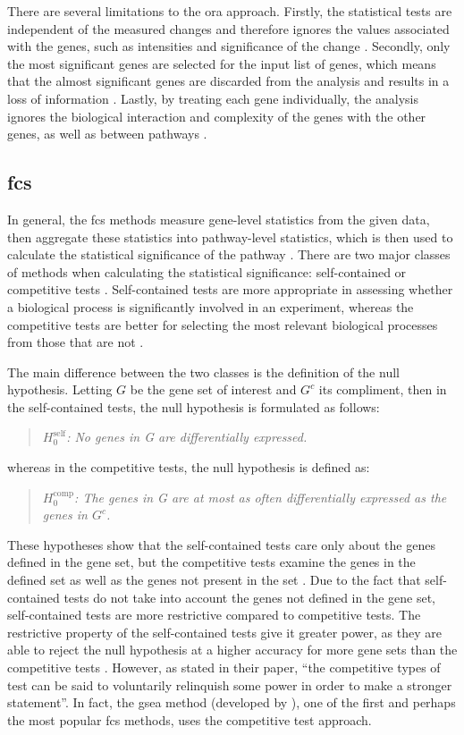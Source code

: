 There are several limitations to the \gls{ora} approach.
Firstly, the statistical tests are independent of the measured changes and therefore ignores the values associated with the genes, such as intensities and significance of the change \citep{Khatri2012}.
Secondly, only the most significant genes are selected for the input list of genes, which means that the almost significant genes are discarded from the analysis and results in a loss of information \citep{Khatri2012}.
Lastly, by treating each gene individually, the analysis ignores the biological interaction and complexity of the genes with the other genes, as well as between pathways \citep{Khatri2012}.

\subsection{\Gls{fcs}}
\label{ssub:fcs}

In general, the \gls{fcs} methods measure gene-level statistics from the given data, then aggregate these statistics into pathway-level statistics, which is then used to calculate the statistical significance of the pathway \citep{Khatri2012}.
There are two major classes of methods when calculating the statistical significance: self-contained or competitive tests \citep{Goeman2007}.
Self-contained tests are more appropriate in assessing whether a biological process is significantly involved in an experiment, whereas the competitive tests are better for selecting the most relevant biological processes from those that are not \citep{Wu2012}.

The main difference between the two classes is the definition of the null hypothesis.
Letting $G$ be the gene set of interest and $G^c$ its compliment, then in the self-contained tests, the null hypothesis is formulated as follows:
\begin{quote}
	\textit{$H_0^{\textrm{self}}$: No genes in G are differentially expressed. }
\end{quote}
whereas in the competitive tests, the null hypothesis is defined as:
\begin{quote}
	\textit{$H_0^{\textrm{comp}}$: The genes in G are at most as often differentially expressed as the genes in $G^c$.
	}
\end{quote}
These hypotheses show that the self-contained tests care only about the genes defined in the gene set, but the competitive tests examine the genes in the defined set as well as the genes not present in the set \citep{Wu2012}.
Due to the fact that self-contained tests do not take into account the genes not defined in the gene set, self-contained tests are more restrictive compared to competitive tests.
The restrictive property of the self-contained tests give it greater power, as they are able to reject the null hypothesis at a higher accuracy for more gene sets than the competitive tests \citep{Goeman2007}.
However, as \citet{Goeman2007} stated in their paper, ``the competitive types of test can be said to voluntarily relinquish some power in order to make a stronger statement''.
In fact, the \gls{gsea} method (developed by \citet{Subramanian2005}), one of the first and perhaps the most popular \gls{fcs} methods, uses the competitive test approach.

